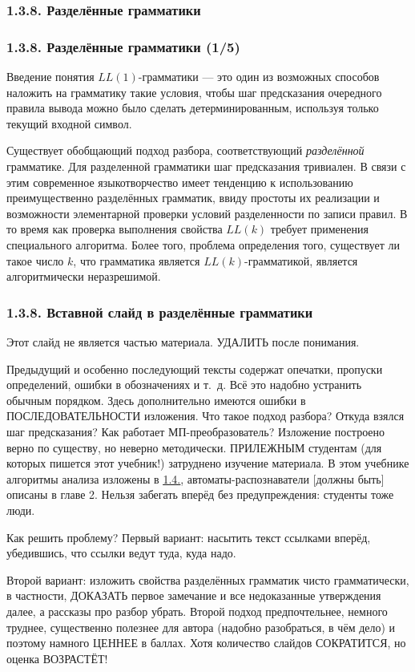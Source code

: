 \documentclass[mathserif,12pt,aspectratio=169]{beamer}
\def\emразделенной{\em разделенной}
\def\em#1{\it\color{blue}#1}
\def\DMref#1#2{{\color{blue}\underline{\hyperlink{#2}{#1}}}}
\begin{document}
\subsubsection{1.3.8. Разделённые грамматики}\label{1.3.8.}
\begin{frame}
\frametitle{1.3.8. Разделённые грамматики (1/5)}
Введение понятия $LL(1)$-грамматики — это один из возможных способов наложить на грамматику такие условия, чтобы шаг предсказания очередного правила вывода можно было сделать детерминированным, используя только текущий входной символ.

\smallskip
Существует обобщающий подход разбора, соответствующий {\em разделённой} грамматике. 
Для разделенной грамматики шаг предсказания тривиален. В связи с этим современное языкотворчество имеет тенденцию к использованию преимущественно разделённых грамматик,
ввиду простоты их реализации и возможности элементарной проверки условий разделенности по записи правил.
В то время как проверка выполнения свойства 
$LL(k)$ требует применения специального алгоритма.
Более того, проблема определения того, существует ли такое число $k$,
что грамматика является $LL(k)$-грамматикой,
является алгоритмически неразрешимой.  
\end{frame}

\begin{frame}
\frametitle{1.3.8. Вставной слайд в разделённые грамматики}
Этот слайд не является частью материала. УДАЛИТЬ после понимания.

\smallskip
Предыдущий и особенно последующий тексты содержат опечатки,
пропуски определений, ошибки в обозначениях и т.~д.
Всё это надобно устранить обычным порядком.
Здесь дополнительно имеются ошибки в ПОСЛЕДОВАТЕЛЬНОСТИ изложения.
Что такое подход разбора? Откуда взялся шаг предсказания?
Как работает МП-преобразователь?  
Изложение построено верно по существу,
но неверно методически.
ПРИЛЕЖНЫМ студентам (для которых пишется этот учебник!)
затруднено изучение материала.
В этом учебнике алгоритмы анализа
изложены в \DMref{1.4.}{1.4.},
автоматы-распознаватели [должны быть] описаны в главе 2.
Нельзя забегать вперёд без предупреждения: студенты тоже люди.

\smallskip
Как решить проблему?
Первый вариант: насытить текст ссылками вперёд,
убедившись, что ссылки ведут туда, куда надо.

\smallskip
Второй вариант: 
изложить свойства разделённых грамматик чисто грамматически, в частности,
ДОКАЗАТЬ первое замечание и все недоказанные утверждения далее,
 а рассказы про разбор убрать.
Второй подход предпочтельнее, немного труднее,
существенно полезнее для автора (надобно разобраться, в чём дело)
и поэтому намного ЦЕННЕЕ в баллах. 
Хотя количество слайдов СОКРАТИТСЯ, но оценка ВОЗРАСТЁТ! 

\end{frame}
\end{document}
